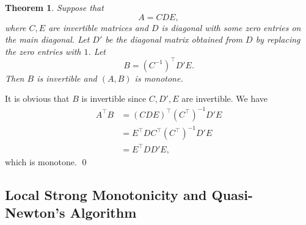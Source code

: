 \documentclass[11pt]{article}
\makeatletter
\renewenvironment{proof}[1][\proofname]{\par
	\normalfont
	\topsep0\p@\@plus3\p@ \trivlist
	\item[\hskip\labelsep\itshape
	#1\@addpunct{.}]\ignorespaces
}{%
	\qed\endtrivlist
}
\newtheorem{theorem}{Theorem}[section]
\theoremstyle{definition}
\theoremstyle{definition}
\theoremstyle{definition}
\makeatother
\begin{document}
\begin{theorem}
\label{thm:3.3}
Suppose that 
\[
A = C D E,
\] 
where $C,E$ are invertible matrices and $D$ is diagonal with some zero entries on the main diagonal. Let $D'$ be the diagonal matrix obtained from $D$ by replacing the zero entries with $1$. Let 
    \[
    B = (C^{-1})^\top D' E.
      \] 
Then $B$ is invertible and  $(A,B)$ is monotone. 
\end{theorem}

\begin{proof}
It is obvious that $B$ is invertible since $C, D', E$ are invertible. We have
\begin{align*}
A^\top B &= (C D E)^\top (C^\top)^{-1} D' E \\
         &= E^\top D C^\top (C^\top)^{-1} D' E \\
         &= E^\top D D' E,
\end{align*} 
which is monotone. 
\end{proof}

\subsection{Local Strong Monotonicity and {Quasi-Newton's Algorithm}}
\end{document}
